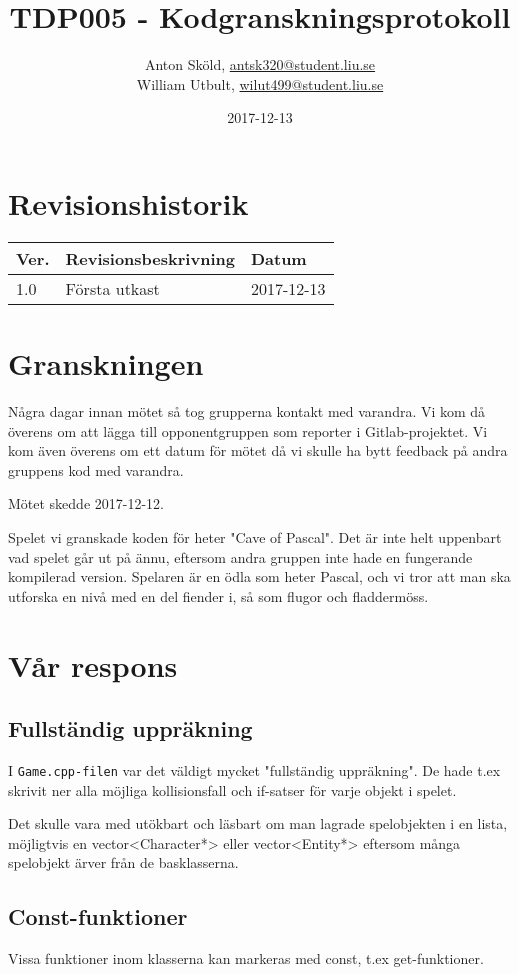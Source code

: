 \documentclass{TDP005mall}
\author{Anton Sköld, \url{antsk320@student.liu.se}\\
  William Utbult, \url{wilut499@student.liu.se}}
\title{TDP005 - Kodgranskningsprotokoll}
\date{2017-12-13}
\begin{document}
\projectpage
\section{Revisionshistorik}
\begin{table}[!h]
\begin{tabularx}{\linewidth}{|l|X|l|}
\hline
Ver. & Revisionsbeskrivning & Datum \\\hline
1.0 & Första utkast & 2017-12-13 \\\hline
\end{tabularx}
\end{table}

\tableofcontents

\clearpage
\section{Granskningen}

Några dagar innan mötet så tog grupperna kontakt med varandra. Vi kom då överens om att lägga till opponentgruppen som reporter i Gitlab-projektet.
Vi kom även överens om ett datum för mötet då vi skulle ha bytt feedback på andra gruppens kod med varandra.

Mötet skedde 2017-12-12.

Spelet vi granskade koden för heter "Cave of Pascal". Det är inte helt uppenbart vad spelet går ut på ännu, eftersom andra gruppen inte hade en fungerande kompilerad version. Spelaren är en ödla som heter Pascal, och vi tror att man ska utforska en nivå med en del fiender i, så som flugor och fladdermöss.

\section{Vår respons}
\subsection{Fullständig uppräkning}
I \verb|Game.cpp-filen| var det väldigt mycket "fullständig uppräkning". De hade t.ex skrivit ner alla möjliga kollisionsfall och if-satser för varje objekt i spelet.

Det skulle vara med utökbart och läsbart om man lagrade spelobjekten i en lista, möjligtvis en vector<Character*> eller vector<Entity*> eftersom många spelobjekt ärver från de basklasserna.

\subsection{Const-funktioner}
Vissa funktioner inom klasserna kan markeras med const, t.ex get-funktioner.
\end{document}
